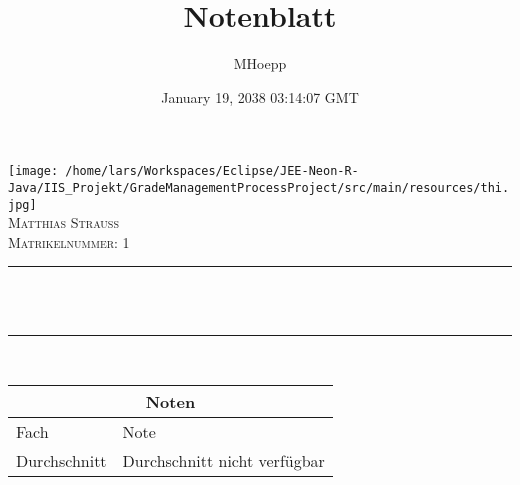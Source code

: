 \documentclass[12pt]{article}
\title{Notenblatt}
\author{MHoepp}
\date{January 19, 2038 03:14:07 GMT}
\makeatletter
\let\thetitle\@title
\makeatother
\begin{document}
   
   
    \begin{titlepage}
        \centering
        \texttt{[image: /home/lars/Workspaces/Eclipse/JEE-Neon-R-Java/IIS\_Projekt/GradeManagementProcessProject/src/main/resources/thi.jpg]}\\[0.5 cm] 
        \textsc{\Large Matthias Strauß}\\[1.0 cm] %
        \textsc{Matrikelnummer: 1}\\[0.25 cm]               %
        \rule{\linewidth}{0.2 mm} \\[0.2 cm]
        { \huge \bfseries \thetitle}\\
        \rule{\linewidth}{0.2 mm} \\[0.75 cm]
       
       
       
        \setlength{\arrayrulewidth}{1mm}
        \setlength{\tabcolsep}{12pt}
        \renewcommand{\arraystretch}{2.5}
        {
            \begin{tabular}{ |p{5cm}|p{1.5cm}|  }
                \hline
                \multicolumn{2}{|c|}{Noten} \\
                \hline
                Fach& Note  \\
                \hline

               
               
               
                \hline
                Durchschnitt & Durchschnitt nicht verfügbar  \\
                \hline
            \end{tabular}
        }
       
       
       
       
       
       
       
    \end{titlepage}
   
   
   
\end{document}
